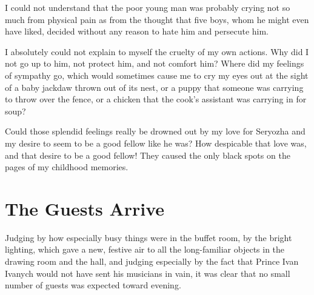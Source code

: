 I could not understand that the poor young man was probably crying not so much from physical pain as from the thought that five boys, whom he might even have liked, decided without any reason to hate him and persecute him.

I absolutely could not explain to myself the cruelty of my own actions. Why did I not go up to him, not protect him, and not comfort him? Where did my feelings of sympathy go, which would sometimes cause me to cry my eyes out at the sight of a baby jackdaw thrown out of its nest, or a puppy that someone was carrying to throw over the fence, or a chicken that the cook's assistant was carrying in for soup?

Could those splendid feelings really be drowned out by my love for Seryozha and my desire to seem to be a good fellow like he was? How despicable that love was, and that desire to be a good fellow! They caused the only black spots on the pages of my childhood memories.

\chapter{The Guests Arrive} %

Judging by how especially busy things were in the buffet room, by the bright lighting, which gave a new, festive air to all the long-familiar objects in the drawing room and the hall, and judging especially by the fact that Prince Ivan Ivanych would not have sent his musicians in vain, it was clear that no small number of guests was expected toward evening.

